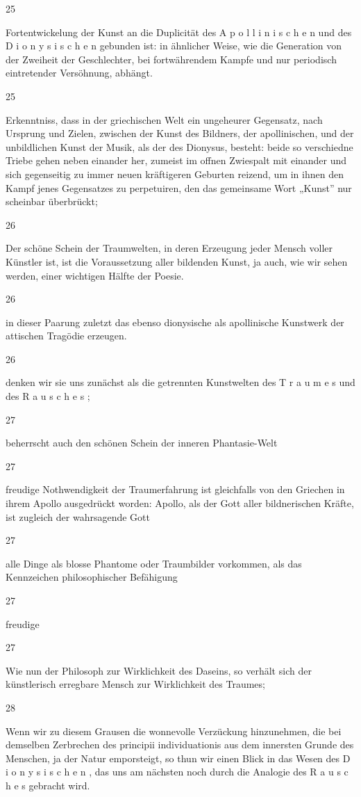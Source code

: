 \documentclass[
  letterpaper,
  DIV=11,
  numbers=noendperiod]{scrartcl}
\begin{document}
25

Fortentwickelung der Kunst an die Duplicität des A p o l l i n i s c h e
n und des D i o n y s i s c h e n gebunden ist: in ähnlicher Weise, wie
die Generation von der Zweiheit der Geschlechter, bei fortwährendem
Kampfe und nur periodisch eintretender Versöhnung, abhängt.

25

Erkenntniss, dass in der griechischen Welt ein ungeheurer Gegensatz,
nach Ursprung und Zielen, zwischen der Kunst des Bildners, der
apollinischen, und der unbildlichen Kunst der Musik, als der des
Dionysus, besteht: beide so verschiedne Triebe gehen neben einander her,
zumeist im offnen Zwiespalt mit einander und sich gegenseitig zu immer
neuen kräftigeren Geburten reizend, um in ihnen den Kampf jenes
Gegensatzes zu perpetuiren, den das gemeinsame Wort „Kunst'' nur
scheinbar überbrückt;

26

Der schöne Schein der Traumwelten, in deren Erzeugung jeder Mensch
voller Künstler ist, ist die Voraussetzung aller bildenden Kunst, ja
auch, wie wir sehen werden, einer wichtigen Hälfte der Poesie.

26

in dieser Paarung zuletzt das ebenso dionysische als apollinische
Kunstwerk der attischen Tragödie erzeugen.

26

denken wir sie uns zunächst als die getrennten Kunstwelten des T r a u m
e s und des R a u s c h e s ;

27

beherrscht auch den schönen Schein der inneren Phantasie-Welt

27

freudige Nothwendigkeit der Traumerfahrung ist gleichfalls von den
Griechen in ihrem Apollo ausgedrückt worden: Apollo, als der Gott aller
bildnerischen Kräfte, ist zugleich der wahrsagende Gott

27

alle Dinge als blosse Phantome oder Traumbilder vorkommen, als das
Kennzeichen philosophischer Befähigung

27

freudige

27

Wie nun der Philosoph zur Wirklichkeit des Daseins, so verhält sich der
künstlerisch erregbare Mensch zur Wirklichkeit des Traumes;

28

Wenn wir zu diesem Grausen die wonnevolle Verzückung hinzunehmen, die
bei demselben Zerbrechen des principii individuationis aus dem innersten
Grunde des Menschen, ja der Natur emporsteigt, so thun wir einen Blick
in das Wesen des D i o n y s i s c h e n , das uns am nächsten noch
durch die Analogie des R a u s c h e s gebracht wird.
\end{document}

